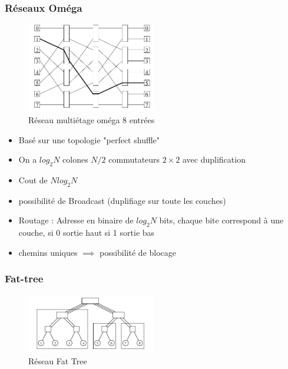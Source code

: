 \documentclass[12pt,a4paper,oneside, titlepage]{article}
\begin{document}
      \subsubsection*{Réseaux Oméga}

      \begin{figure}[H]
        \centering
        \includegraphics[width=0.5\textwidth]{images/omega}
        \caption{Réseau multiétage oméga 8 entrées}
      \end{figure}

      \begin{itemize}
        \item Basé sur une topologie "perfect shuffle"
        \item On a $log_2 N$ colones $N/2$ commutateurs $2\times2$ avec duplification
        \item Cout de $N log_2 N$
        \item possibilité de Broadcast (duplifiage sur toute les couches)
        \item Routage : Adresse en binaire de $log_2 N$ bits, chaque bite correspond à une couche, si 0 sortie haut si 1 sortie bas
        \item chemins uniques $\implies$ possibilité de blocage
      \end{itemize}

    \subsubsection*{Fat-tree}

      \begin{figure}[H]
        \centering
        \includegraphics[width=0.5\textwidth]{images/ftree}
        \caption{Réseau Fat Tree}
      \end{figure}
\end{document}
